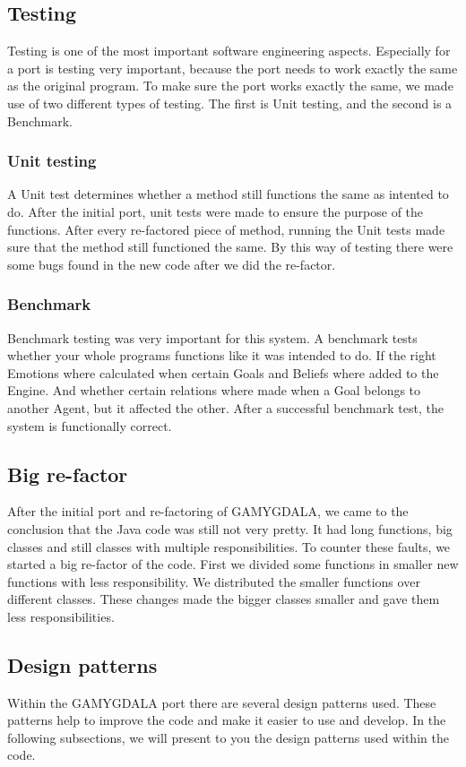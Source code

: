 \subsection{Testing}
Testing is one of the most important software engineering aspects. Especially for a port is testing very important, because the port needs to work exactly the same as the original program. To make sure the port works exactly the same, we made use of two different types of testing. The first is Unit testing, and the second is a Benchmark.

\subsubsection{Unit testing}
A Unit test determines whether a method still functions the same as intented to do. After the initial port, unit tests were made to ensure the purpose of the functions. After every re-factored piece of method, running the Unit tests made sure that the method still functioned the same. By this way of testing there were some bugs found in the new code after we did the re-factor.

\subsubsection{Benchmark}
Benchmark testing was very important for this system. A benchmark tests whether your whole programs functions like it was intended to do. If the right Emotions where calculated when certain Goals and Beliefs where added to the Engine. And whether certain relations where made when a Goal belongs to another Agent, but it affected the other. After a successful benchmark test, the system is functionally correct. 

\subsection{Big re-factor}
After the initial port and re-factoring of GAMYGDALA, we came to the conclusion that the Java code was still not very pretty. It had long functions, big classes and still classes with multiple responsibilities. To counter these faults, we started a big re-factor of the code. First we divided some functions in smaller new functions with less responsibility. We distributed the smaller functions over different classes. These changes made the bigger classes smaller and gave them less responsibilities.  

\subsection{Design patterns}
Within the GAMYGDALA port there are several design patterns used. These patterns help to improve the code and make it easier to use and develop. In the following subsections, we will present to you the design patterns used within the code.

